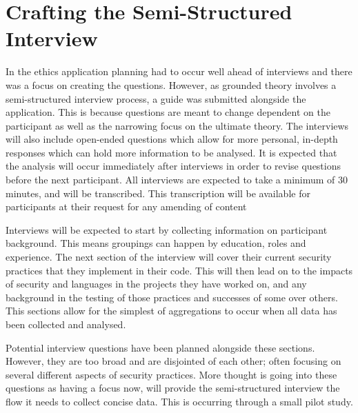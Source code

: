 \section{Crafting the Semi-Structured Interview}

\par In the ethics application planning had to occur well ahead of interviews and there was a focus on creating the questions. However, as grounded theory involves a semi-structured interview process, a guide was submitted alongside the application. This is because questions are meant to change dependent on the participant as well as the narrowing focus on the ultimate theory. The interviews will also include open-ended questions which allow for more personal, in-depth responses which can hold more information to be analysed. It is expected that the analysis will occur immediately after interviews in order to revise questions before the next participant.  All interviews are expected to take a minimum of 30 minutes, and will be transcribed. This transcription will be available for participants at their request for any amending of content
\newline
\par Interviews will be expected to start by collecting information on participant background. This means groupings can happen by education, roles and experience. The next section of the interview will cover their current security practices that they implement in their code. This will then lead on to the impacts of security and languages in the projects they have worked on, and any background in the testing of those practices and successes of some over others. This sections allow for the simplest of aggregations to occur when all data has been collected and analysed. 
\newline
\par Potential interview questions have been planned alongside these sections. However, they are too broad and are disjointed of each other; often focusing on several different aspects of security practices. More thought is going into these questions as having a focus now, will provide the semi-structured interview the flow it needs to collect concise data. This is occurring through a small pilot study.




